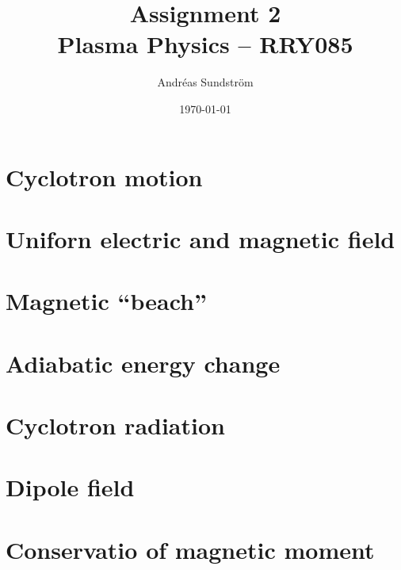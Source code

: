 \documentclass[11pt,a4paper, 
english, swedish %
]{article}
\begin{document}


\title{Assignment 2 \\
{\Large Plasma Physics -- RRY085}}
\author{Andréas Sundström}
\date{\today}%

\maketitle




\section{Cyclotron motion}


\section{Uniforn electric and magnetic field}


\section{Magnetic ``beach''}


\section{Adiabatic energy change}


\section{Cyclotron radiation}


\section{Dipole field}



\section{Conservatio of magnetic moment}




\end{document}
